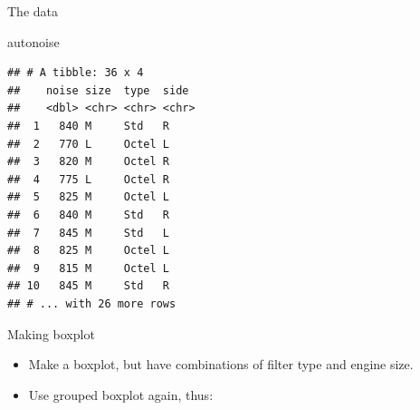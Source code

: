 \documentclass[
  ignorenonframetext,
]{beamer}
\newenvironment{Shaded}{\begin{snugshade}}{\end{snugshade}}
\newcommand{\DataTypeTok}[1]{\textcolor[rgb]{0.13,0.29,0.53}{#1}}
\newcommand{\KeywordTok}[1]{\textcolor[rgb]{0.13,0.29,0.53}{\textbf{#1}}}
\newcommand{\NormalTok}[1]{#1}
\newcommand{\OperatorTok}[1]{\textcolor[rgb]{0.81,0.36,0.00}{\textbf{#1}}}
\newcommand{\StringTok}[1]{\textcolor[rgb]{0.31,0.60,0.02}{#1}}
\begin{document}
\begin{frame}[fragile]{The data}
\protect\hypertarget{the-data-8}{}

\begin{Shaded}
\begin{Highlighting}[]
\NormalTok{autonoise}
\end{Highlighting}
\end{Shaded}

\begin{verbatim}
## # A tibble: 36 x 4
##    noise size  type  side 
##    <dbl> <chr> <chr> <chr>
##  1   840 M     Std   R    
##  2   770 L     Octel L    
##  3   820 M     Octel R    
##  4   775 L     Octel R    
##  5   825 M     Octel L    
##  6   840 M     Std   R    
##  7   845 M     Std   L    
##  8   825 M     Octel L    
##  9   815 M     Octel L    
## 10   845 M     Std   R    
## # ... with 26 more rows
\end{verbatim}

\end{frame}

\begin{frame}[fragile]{Making boxplot}
\protect\hypertarget{making-boxplot}{}

\begin{itemize}
\item
  Make a boxplot, but have combinations of filter type and engine size.
\item
  Use grouped boxplot again, thus:
\end{itemize}

\begin{Shaded}
\end{Shaded}

\end{frame}
\end{document}
